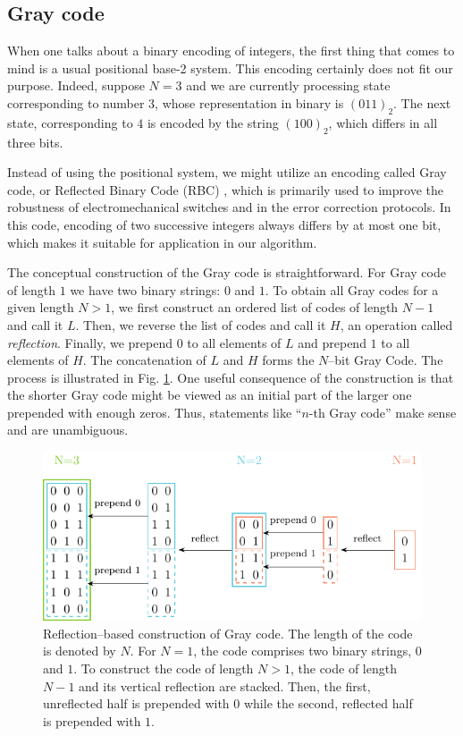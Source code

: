 \subsection{Gray code}
When one talks about a binary encoding of integers, the first thing that comes
to mind is a usual positional base-2 system. This encoding certainly does not
fit our purpose. Indeed, suppose $N=3$ and we are currently processing state
corresponding to number $3$, whose representation in binary is $(011)_{2}$. The
next state, corresponding to $4$ is encoded by the string $(100)_{2}$, which
differs in all three bits.

Instead of using the positional system, we might utilize an encoding called
Gray code, or Reflected Binary Code (RBC) \cite{gray,lucal1959}, which is primarily used to improve
the robustness of electromechanical switches and in the error correction protocols.
In this code, encoding of two successive integers always differs by at most one
bit, which makes it suitable for application in our algorithm.

The conceptual construction of the Gray code is straightforward. For Gray code of
length $1$ we have two binary strings: $0$ and $1$. To obtain all Gray codes
for a given length $N > 1$, we first construct an ordered list of codes of
length $N-1$ and call it $L$. Then, we reverse the list of codes and call it
$H$, an operation called \emph{reflection}. Finally, we prepend $0$ to all
elements of $L$ and prepend $1$ to all elements of $H$. The concatenation of
$L$ and $H$ forms the $N$--bit Gray Code. The process is illustrated in Fig.
\ref{fig:gray}. One useful consequence of the construction is that the shorter
Gray code might be viewed as an initial part of the larger one prepended with
enough zeros. Thus, statements like ``$n$-th Gray code'' make sense and are
unambiguous.

\begin{figure}
  \includegraphics[width=\textwidth]{figures/gray.pdf}
  \caption{Reflection--based construction of Gray code. The length of the code is denoted
    by $N$. For $N=1$, the code comprises two binary strings, $0$ and $1$. To
    construct the code of length $N>1$, the code of length $N-1$ and its vertical
    reflection are stacked. Then, the first, unreflected half is prepended with $0$
    while the second, reflected half is prepended with $1$.} \label{fig:gray}
\end{figure}

